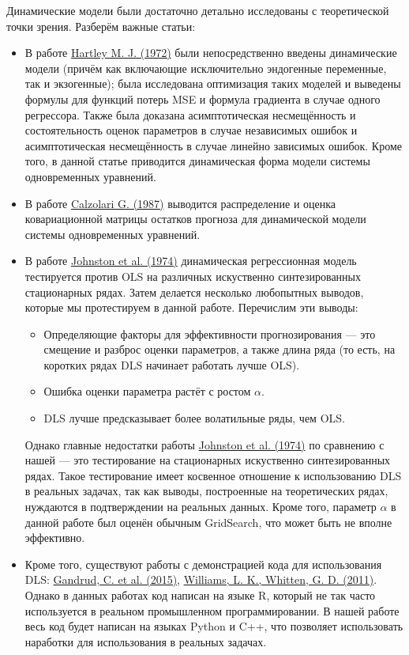\documentclass[a4paper,14pt]{extarticle}
\newcommand{\bibref}[3]{\hyperlink{#1}{#2 (#3)}} %
\begin{document}
Динамические модели были достаточно детально исследованы с теоретической точки зрения. Разберём важные статьи:
\begin{itemize}
	\item В работе \bibref{hartley72}{Hartley M. J.}{1972} были непосредственно введены динамические модели (причём как включающие исключительно эндогенные переменные, так и экзогенные); была исследована оптимизация таких моделей и выведены формулы для функций потерь MSE и формула градиента в случае одного регрессора. Также была доказана асимптотическая несмещённость и состоятельность оценок параметров в случае независимых ошибок и асимптотическая несмещённость в случае линейно зависимых ошибок. Кроме того, в данной статье приводится динамическая форма модели системы одновременных уравнений.
 	\item В работе \bibref{calzolari87}{Calzolari G.}{1987} выводится распределение и оценка ковариационной матрицы остатков прогноза для динамической модели системы одновременных уравнений.
  	\item В работе \bibref{johnston74}{Johnston et al.}{1974} динамическая регрессионная модель тестируется против OLS на различных искуственно синтезированных стационарных рядах. Затем делается несколько любопытных выводов, которые мы протестируем в данной работе. Перечислим эти выводы:
	  \begin{itemize}
		  \item Определяющие факторы для эффективности прогнозирования — это
		  смещение и разброс оценки параметров, а также длина ряда (то есть,
		  на коротких рядах DLS начинает работать лучше OLS).
		  \item Ошибка оценки параметра растёт с ростом $\alpha$.
		   \item DLS лучше предсказывает более волатильные ряды, чем OLS.
	  \end{itemize}
	  Однако главные недостатки работы \bibref{johnston74}{Johnston et al.}{1974} по сравнению с нашей — это тестирование на стационарных искуственно синтезированных рядах. Такое тестирование имеет косвенное отношение к использованию DLS в реальных задачах, так как выводы, построенные на теоретических рядах, нуждаются в подтверждении на реальных данных. Кроме того, параметр $\alpha$ в данной работе был оценён обычным GridSearch, что может быть не вполне эффективно.
	\item Кроме того, существуют работы с демонстрацией кода для использования DLS: \bibref{gandrud15}{Gandrud, C. et al.}{2015}, \bibref{williams11}{Williams, L. K., Whitten, G. D.}{2011}. Однако в данных работах код написан на языке R, который не так часто используется в реальном промышленном программировании. В нашей работе весь код будет написан на языках Python и C++, что позволяет использовать наработки для использования в реальных задачах.
\end{itemize}
\end{document}

